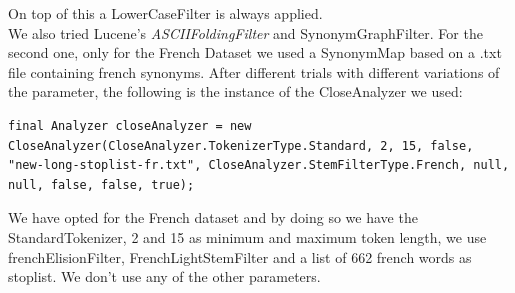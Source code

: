 On top of this a LowerCaseFilter is always applied. \\
We also tried Lucene's \textit{ASCIIFoldingFilter} and SynonymGraphFilter. For the second one, only for the French Dataset we used a SynonymMap based on a .txt file containing french synonyms.
\newline
After different trials with different variations of the parameter, the following is the instance of the CloseAnalyzer we used:

\begin{lstlisting}
final Analyzer closeAnalyzer = new CloseAnalyzer(CloseAnalyzer.TokenizerType.Standard, 2, 15, false, "new-long-stoplist-fr.txt", CloseAnalyzer.StemFilterType.French, null, null, false, false, true);
\end{lstlisting}
We have opted for the French dataset and by doing so we have the StandardTokenizer, 2 and 15 as minimum and maximum token length, we use frenchElisionFilter, FrenchLightStemFilter and a list of 662 french words as stoplist. We don't use any of the other parameters.


